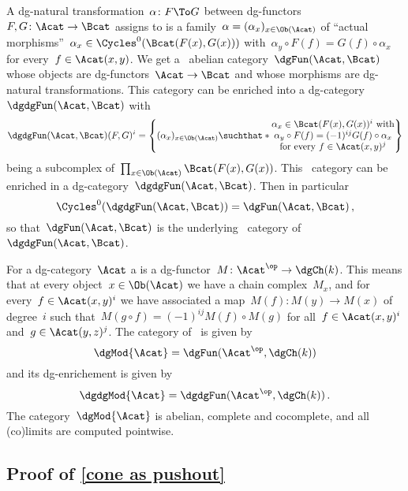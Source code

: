 \documentclass[a4paper,10pt]{scrartcl}
\begin{document}
A dg-natural transformation~$\alpha \colon F \To G$ between dg-functors~$F, G \colon \Acat \to \Bcat$ assigns to is a family~$\alpha = (\alpha_x)_{x \in \Ob(\Acat)}$ of \enquote{actual morphisms}~$\alpha_x \in \Cycles^0(\Bcat(F(x), G(x)))$ with~$\alpha_y \circ F(f) = G(f) \circ \alpha_x$ for every~$f \in \Acat(x,y)$.
We get a~{\klinear} abelian category~$\dgFun(\Acat, \Bcat)$ whose objects are dg-functors~$\Acat \to \Bcat$ and whose morphisms are dg-natural transformations.
This category can be enriched into a dg-category~$\dgdgFun(\Acat, \Bcat)$ with
\[
  \dgdgFun(\Acat, \Bcat)(F,G)^i
  =
  \left\{
    (\alpha_x)_{x \in \Ob(\Acat)}
  \suchthat*
    \begin{tabular}{@{}c@{}}
      $\alpha_x \in \Bcat(F(x), G(x))^i$ with \\
      $\alpha_y \circ F(f) = (-1)^{ij} G(f) \circ \alpha_x$ \\
      for every~$f \in \Acat(x,y)^j$
    \end{tabular}
  \right\}
\]
being a subcomplex of~$\prod_{x \in \Ob(\Acat)} \Bcat(F(x), G(x))$.
This~{\klinear} category can be enriched in a dg-category~$\dgdgFun(\Acat, \Bcat)$.
Then in particular
\[
  \Cycles^0(\dgdgFun(\Acat, \Bcat))
  =
  \dgFun(\Acat, \Bcat) \,,
\]
so that~$\dgFun(\Acat, \Bcat)$ is the underlying~{\klinear} category of~$\dgdgFun(\Acat, \Bcat)$.

For a dg-category~$\Acat$ a  is a dg-functor~$M \colon \Acat^{\op} \to \dgCh(k)$.
This means that at every object~$x \in \Ob(\Acat)$ we have a chain complex~$M_x$, and for every~$f \in \Acat(x,y)^i$ we have associated a map~$M(f) \colon M(y) \to M(x)$ of degree~$i$ such that~$M(g \circ f) = (-1)^{ij} M(f) \circ M(g)$ for all~$f \in \Acat(x,y)^i$ and~$g \in \Acat(y,z)^j$.
The category of~{\dgmodules{$\Acat$}} is given by
\[
  \dgMod{\Acat}
  =
  \dgFun(\Acat^{\op}, \dgCh(k))
\]
and its dg-enrichement is given by
\[
  \dgdgMod{\Acat}
  =
  \dgdgFun(\Acat^{\op}, \dgCh(k)) \,.
\]
The category~$\dgMod{\Acat}$ is abelian, complete and cocomplete, and all (co)limits are computed pointwise.


\subsection{Proof of \cref{cone as pushout}}
\label{cone as pushout proof}
\end{document}
